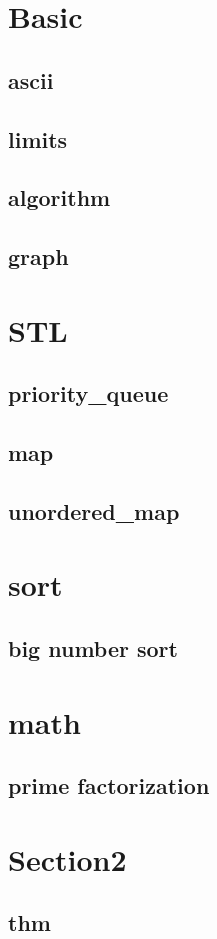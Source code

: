 \section{Basic}
    \subsection{ascii}
        
    \subsection{limits}
        
    \subsection{algorithm}
        
    \subsection{graph}
        

\section{STL}
    \subsection{priority\_queue}
        
    \subsection{map}
        
    \subsection{unordered\_map}
        

\section{sort}
    \subsection{big number sort}
        

\section{math}
        \subsection{prime factorization}
            
  

\section{Section2}
    \subsection{thm}
        